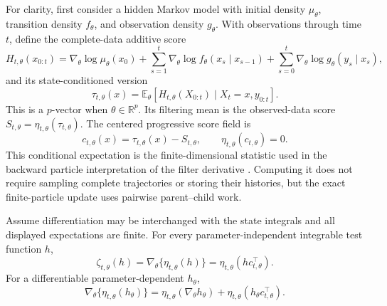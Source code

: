 For clarity, first consider a hidden Markov model with initial density
\(\mu_\theta\), transition density \(f_\theta\), and observation density
\(g_\theta\).  With observations through time \(t\), define the complete-data
additive score
\begin{equation}
\label{eq:bf-ledh-progressive-complete-score}
  H_{t,\theta}(x_{0:t})
  =\nabla_\theta\log\mu_\theta(x_0)
   +\sum_{s=1}^{t}\nabla_\theta\log f_\theta(x_s\mid x_{s-1})
   +\sum_{s=0}^{t}\nabla_\theta\log g_\theta(y_s\mid x_s),
\end{equation}
and its state-conditioned version
\begin{equation}
\label{eq:bf-ledh-progressive-score-mark}
  \tau_{t,\theta}(x)
  =\mathbb E_\theta\!\left[
      H_{t,\theta}(X_{0:t})\mid X_t=x,y_{0:t}
    \right].
\end{equation}
This is a \(p\)-vector when \(\theta\in\mathbb R^p\).  Its filtering mean is the
observed-data score
\(S_{t,\theta}=\eta_{t,\theta}(\tau_{t,\theta})\).  The centered progressive
score field is
\begin{equation}
\label{eq:bf-ledh-centered-progressive-score}
  c_{t,\theta}(x)=\tau_{t,\theta}(x)-S_{t,\theta},
  \qquad \eta_{t,\theta}(c_{t,\theta})=0.
\end{equation}
This conditional expectation is the finite-dimensional statistic used in the
backward particle interpretation of the filter derivative
\citep[Section~2, Eq.~(2.5), Algorithm~1]{delmoral2015uniform}.  Computing it
does not require sampling complete trajectories or storing their histories, but
the exact finite-particle update uses pairwise parent--child work.

\begin{proposition}
\label{prop:bf-ledh-progressive-score-tangent-representation}
Assume differentiation may be interchanged with the state integrals and all
displayed expectations are finite.  For every parameter-independent integrable
test function \(h\),
\begin{equation}
\label{eq:bf-ledh-progressive-score-covariance}
  \zeta_{t,\theta}(h)
  =\nabla_\theta\{\eta_{t,\theta}(h)\}
  =\eta_{t,\theta}\!\left(hc_{t,\theta}^{\top}\right).
\end{equation}
For a differentiable parameter-dependent \(h_\theta\),
\begin{equation}
\label{eq:bf-ledh-progressive-score-total-derivative}
  \nabla_\theta\{\eta_{t,\theta}(h_\theta)\}
  =\eta_{t,\theta}(\nabla_\theta h_\theta)
   +\eta_{t,\theta}\!\left(h_\theta c_{t,\theta}^{\top}\right).
\end{equation}
\end{proposition}

